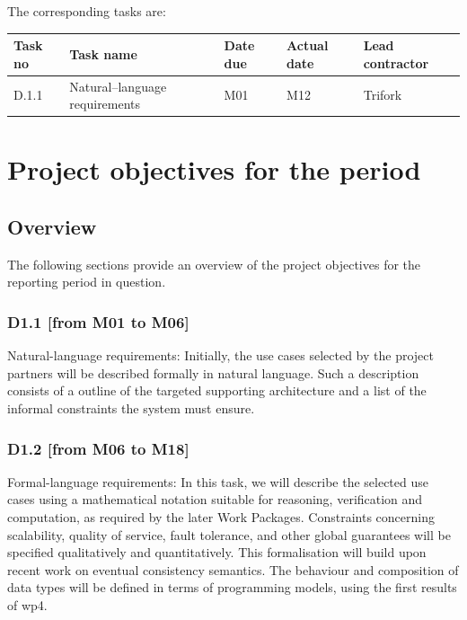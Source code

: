 \documentclass[12pt,twoside]{article}
\begin{document}
The corresponding tasks are:
\begin{table}[ht!]
	\begin{tabular}{|l|l|p{1cm}|p{1.3cm}|p{3cm}|}
		\hline
		\textbf{Task no} & \textbf{Task name} & \textbf{Date due} & \textbf{Actual date} & \textbf{Lead contractor}\\
		\hline
		D.1.1 & Natural--language requirements & M01 & M12 & Trifork \\
		\hline
	\end{tabular}
\end{table}


\section{Project objectives for the period} \label{s:DX-description-of-milestones}
\subsection{Overview}
The following sections provide an overview of the project objectives for the reporting period in question.

\subsubsection{D1.1 [from M01 to M06]}
Natural-language requirements: Initially, the use cases selected by the project partners will be described formally in natural language. Such a description consists of a outline of the targeted supporting architecture and a list of the informal constraints the system must ensure.



\subsubsection{D1.2 [from M06 to M18]}
Formal-language requirements: In this task, we will describe the selected use cases using a mathematical notation suitable for reasoning, verification and computation, as required by the later Work Packages. Constraints concerning scalability, quality of service, fault tolerance, and other global guarantees will be specified qualitatively and quantitatively. This formalisation will build upon recent work on eventual consistency semantics. The behaviour and composition of data types will be defined in terms of programming models, using the first results of \gls{wp4}.
\end{document}

